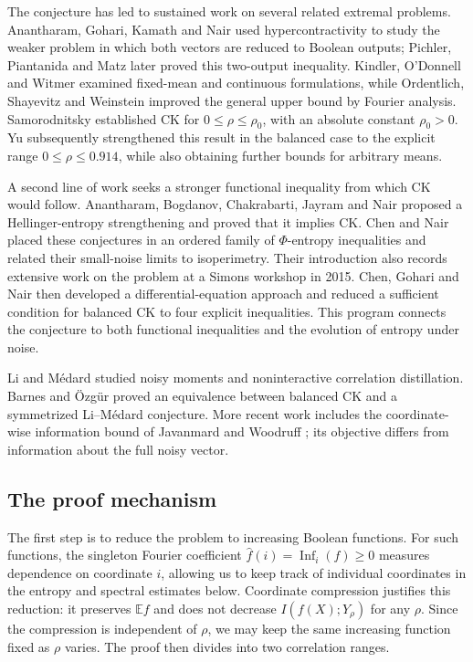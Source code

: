 \documentclass[11pt,letterpaper]{amsart}
\newcommand{\E}{\mathbb E}
\newcommand{\1}{\mathbf 1}
\numberwithin{equation}{section}
\begin{document}
The conjecture has led to sustained work on several related extremal
problems. Anantharam, Gohari, Kamath and Nair
\cite{AnantharamGohariKamathNair2013} used hypercontractivity to study
the weaker problem in which both vectors are reduced to Boolean
outputs; Pichler, Piantanida and Matz \cite{PichlerPiantanidaMatz2018}
later proved this two-output inequality. Kindler, O'Donnell and Witmer \cite{KindlerODonnellWitmer2015}
examined fixed-mean and continuous formulations, while Ordentlich,
Shayevitz and Weinstein \cite{Ordentlich2016} improved the general
upper bound by Fourier analysis. Samorodnitsky
\cite{Samorodnitsky2016} established CK for
$0\le\rho\le\rho_0$, with an absolute constant $\rho_0>0$. Yu \cite{Yu2023,Yu2026Local}
subsequently strengthened this result in the balanced case
to the explicit range $0\le\rho\le0.914$, while also obtaining
further bounds for arbitrary means.

A second line of work seeks a stronger functional inequality from
which CK would follow. Anantharam, Bogdanov, Chakrabarti, Jayram and
Nair \cite{AnantharamEtAl2017} proposed a Hellinger-entropy strengthening
and proved that it implies CK. Chen and Nair \cite{ChenNair2024}
placed these conjectures in an ordered family of $\Phi$-entropy
inequalities and related their small-noise limits to isoperimetry.
Their introduction also records extensive work on the problem at a
Simons workshop in 2015. Chen, Gohari and Nair
\cite{ChenGohariNair2025} then developed a differential-equation
approach and reduced a sufficient condition for balanced CK to
four explicit inequalities. This program connects the conjecture
to both functional inequalities and the evolution of entropy under
noise. 

Li and M\'edard \cite{LiMedard2021} studied noisy moments and
noninteractive correlation distillation. Barnes and \"Ozg\"ur
\cite{BarnesOzgur2020} proved an equivalence between balanced CK and
a symmetrized Li--M\'edard conjecture. More recent work includes
the coordinate-wise information bound of Javanmard and Woodruff
\cite{JavanmardWoodruff2026}; its objective differs from information
about the full noisy vector.


\subsection{The proof mechanism}

The first step is to reduce the problem to increasing Boolean
functions. For such functions, the singleton Fourier coefficient
$\widehat f(i)=\operatorname{Inf}_i(f)\ge0$ measures dependence on
coordinate $i$, allowing us to keep track of individual coordinates
in the entropy and spectral estimates below. Coordinate compression
justifies this reduction: it preserves $\E f$ and does not decrease
$I(f(X);Y_\rho)$ for any $\rho$. Since the compression is independent
of $\rho$, we may keep the same increasing function fixed as $\rho$
varies. The proof then divides into two correlation ranges.
\end{document}
